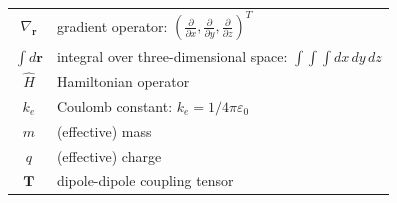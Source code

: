 \begin{tabular}{cp{}}
  $\nabla_{\mathbf{r}}$		    & gradient operator: $\left(\frac{\partial}{\partial x},\frac{\partial}{\partial y},\frac{\partial}{\partial z}\right)^T$ \\
  $\int d\mathbf{r}$		    & integral over three-dimensional space: $\int \int \int dx\,dy\,dz$ \\
  $\hat{H}$           & Hamiltonian operator \\
  $k_e$               & Coulomb constant: $k_e = 1/4\pi\varepsilon_0$ \\
  $m$                 & (effective) mass \\
  $q$                 & (effective) charge \\
  $\mathbf{T}$        & dipole-dipole coupling tensor \\
\end{tabular}\\